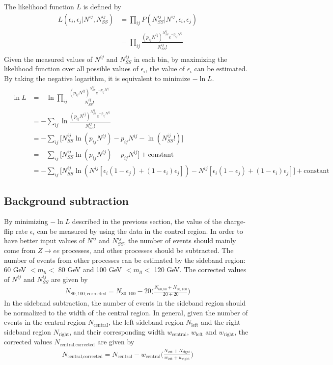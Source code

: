 The likelihood function $L$ is defined by
\begin{align}
L(\epsilon_i,\epsilon_j|N^{ij},N^{ij}_{SS}) &= \prod_{ij} P(N^{ij}_{SS}|N^{ij},\epsilon_i,\epsilon_j) \\
&= \prod_{ij} \frac{ (p_{ij} N^{ij})^{N^{ij}_{SS}} e^{- p_{ij} N^{ij}} }{N^{ij}_{SS}!} \\
\end{align}
Given the measured values of $N^{ij}$ and $N^{ij}_{SS}$ in each bin, by maximizing the likelihood function over all possible values of $\epsilon_i$, the value of $\epsilon_i$ can be estimated.
By taking the negative logarithm, it is equivalent to minimize $- \ln L$.
\begin{align}
- \ln L
&= - \ln \prod_{ij} \frac{ (p_{ij} N^{ij})^{N^{ij}_{SS}} e^{- p_{ij} N^{ij}} }{N^{ij}_{SS}!} \\
&= - \sum_{ij} \ln \frac{ (p_{ij} N^{ij})^{N^{ij}_{SS}} e^{- p_{ij} N^{ij}} }{N^{ij}_{SS}!} \\
&= - \sum_{ij} \Big[ N^{ij}_{SS} \ln (p_{ij} N^{ij}) - p_{ij} N^{ij} - \ln( N^{ij}_{SS}!) \Big] \\
&= - \sum_{ij} \Big[ N^{ij}_{SS} \ln (p_{ij} N^{ij}) - p_{ij} N^{ij} \Big] + \text{constant} \\
&= - \sum_{ij} \Big[ N^{ij}_{SS} \ln (N^{ij}[\epsilon_i (1-\epsilon_j) + (1-\epsilon_i) \epsilon_j]) - N^{ij}[\epsilon_i (1-\epsilon_j) + (1-\epsilon_i) \epsilon_j] \Big] + \text{constant}
\end{align}

\subsection{Background subtraction}
\label{sec:Background_subtraction}
By minimizing $- \ln L$ described in the previous section, the value of the charge-flip rate $\epsilon_i$ can be measured by using the data in the control region.
In order to have better input values of $N^{ij}$ and $N^{ij}_{SS}$, the number of events should mainly come from $Z \rightarrow ee$ processes, and other processes should be subtracted.
The number of events from other processes can be estimated by the sideband region: 60 GeV $<m_{ll}<$ 80 GeV and 100 GeV $<m_{ll}<$ 120 GeV.
The corrected values of $N^{ij}$ and $N^{ij}_{SS}$ are given by
\begin{align}
N_{80,100;\text{corrected}} = N_{80,100} - 20 \Big( \frac{N_{60,80} + N_{80,100}}{20 + 20} \Big)
\end{align}
In the sideband subtraction, the number of events in the sideband region should be normalized to the width of the central region.
In general, given the number of events in the central region $N_{\text{central}}$, the left sideband region $N_{\text{left}}$ and the right sideband region $N_{\text{right}}$, and their corresponding width $w_{\text{central}}$, $w_{\text{left}}$ and $w_{\text{right}}$, the corrected values $N_{\text{central,corrected}}$ are given by
\begin{align}
N_{\text{central,corrected}} = N_{\text{central}} - w_{\text{central}} \Big( \frac{N_{\text{left}} + N_{\text{right}}}{w_{\text{left}} + w_{\text{right}}} \Big)
\end{align}


